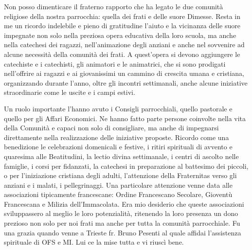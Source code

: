 Non posso dimenticare il fraterno rapporto che ha legato le due comunità religiose della nostra 
parrocchia: quella dei frati e delle suore Dimesse.
Resta in me un ricordo indelebile e pieno di gratitudine l’aiuto e la vicinanza delle suore 
impegnate non solo nella preziosa opera educativa della loro scuola, ma anche nella catechesi dei 
ragazzi, nell’animazione degli anziani e anche nel sovvenire ad alcune necessità della comunità 
dei frati. A quest’opera si devono aggiungere le catechiste e i catechisti, gli animatori e le 
animatrici, che si sono prodigati nell’offrire ai ragazzi e ai giovanissimi un cammino di crescita 
umana e cristiana, organizzando durante l’anno, oltre gli incontri settimanali, anche alcune 
iniziative straordinarie come le uscite e i campi estivi.

Un ruolo importante l’hanno avuto i Consigli parrocchiali, quello pastorale e quello per gli Affari 
Economici. Ne hanno fatto parte persone coinvolte nella vita della Comunità e capaci non solo di 
consigliare, ma anche di impegnarsi direttamente nella realizzazione delle iniziative proposte. 
Ricordo come una benedizione le celebrazioni domenicali e festive, i ritiri spirituali di avvento e 
quaresima alle Beatitudini, la lectio divina settimanale, i centri di ascolto nelle famiglie, i corsi 
per fidanzati, la catechesi in preparazione al battesimo dei piccoli, o per l’iniziazione cristiana 
degli adulti, l’attenzione della Fraternitas verso gli anziani e i malati, i pellegrinaggi.
Una particolare attenzione venne data alle associazioni tipicamente francescane: Ordine 
Francescano Secolare, Gioventù Francescana e Milizia dell’Immacolata. Era mio desiderio che 
queste associazioni sviluppassero al meglio le loro potenzialità, ritenendo la loro presenza un 
dono prezioso non solo per noi frati ma anche per tutta la comunità parrocchiale. Fu una grazia 
quando venne a Trieste fr. Bruno Pesenti al quale affidai l’assistenza spirituale di OFS e MI. Lui 
ce la mise tutta e vi riuscì bene.
\enlargethispage{-\baselineskip}

